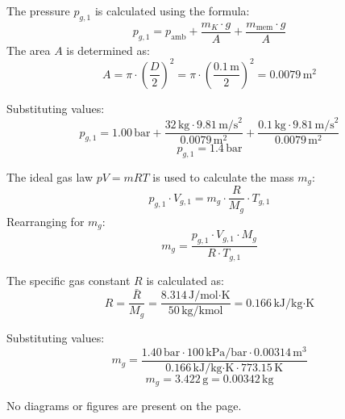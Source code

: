 The pressure \( p_{g,1} \) is calculated using the formula:  
\[
p_{g,1} = p_{\text{amb}} + \frac{m_K \cdot g}{A} + \frac{m_{\text{mem}} \cdot g}{A}
\]  
The area \( A \) is determined as:  
\[
A = \pi \cdot \left(\frac{D}{2}\right)^2 = \pi \cdot \left(\frac{0.1 \, \text{m}}{2}\right)^2 = 0.0079 \, \text{m}^2
\]  

Substituting values:  
\[
p_{g,1} = 1.00 \, \text{bar} + \frac{32 \, \text{kg} \cdot 9.81 \, \text{m/s}^2}{0.0079 \, \text{m}^2} + \frac{0.1 \, \text{kg} \cdot 9.81 \, \text{m/s}^2}{0.0079 \, \text{m}^2}
\]  
\[
p_{g,1} = 1.4 \, \text{bar}
\]  

The ideal gas law \( pV = mRT \) is used to calculate the mass \( m_g \):  
\[
p_{g,1} \cdot V_{g,1} = m_g \cdot \frac{R}{M_g} \cdot T_{g,1}
\]  
Rearranging for \( m_g \):  
\[
m_g = \frac{p_{g,1} \cdot V_{g,1} \cdot M_g}{R \cdot T_{g,1}}
\]  

The specific gas constant \( R \) is calculated as:  
\[
R = \frac{\bar{R}}{M_g} = \frac{8.314 \, \text{J/mol·K}}{50 \, \text{kg/kmol}} = 0.166 \, \text{kJ/kg·K}
\]  

Substituting values:  
\[
m_g = \frac{1.40 \, \text{bar} \cdot 100 \, \text{kPa/bar} \cdot 0.00314 \, \text{m}^3}{0.166 \, \text{kJ/kg·K} \cdot 773.15 \, \text{K}}
\]  
\[
m_g = 3.422 \, \text{g} = 0.00342 \, \text{kg}
\]  

No diagrams or figures are present on the page.